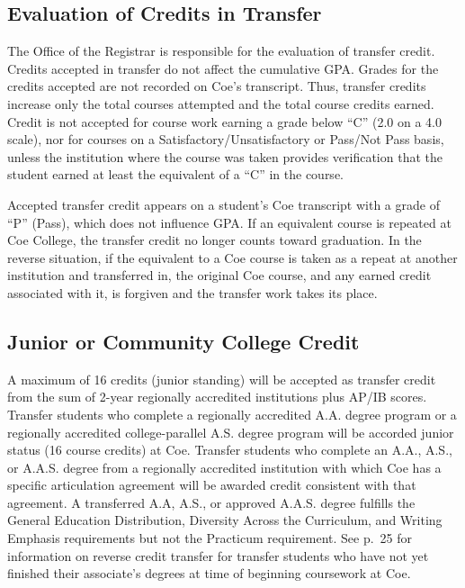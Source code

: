\documentclass[
  letterpaper,
]{scrbook}
\begin{document}
\subsection{Evaluation of Credits in
Transfer}\label{evaluation-of-credits-in-transfer}

The Office of the Registrar is responsible for the evaluation of
transfer credit. Credits accepted in transfer do not affect the
cumulative GPA. Grades for the credits accepted are not recorded on
Coe's transcript. Thus, transfer credits increase only the total courses
attempted and the total course credits earned. Credit is not accepted
for course work earning a grade below ``C'' (2.0 on a 4.0 scale), nor
for courses on a Satisfactory/Unsatisfactory or Pass/Not Pass basis,
unless the institution where the course was taken provides verification
that the student earned at least the equivalent of a ``C'' in the
course.

Accepted transfer credit appears on a student's Coe transcript with a
grade of ``P'' (Pass), which does not influence GPA. If an equivalent
course is repeated at Coe College, the transfer credit no longer counts
toward graduation. In the reverse situation, if the equivalent to a Coe
course is taken as a repeat at another institution and transferred in,
the original Coe course, and any earned credit associated with it, is
forgiven and the transfer work takes its place.

\subsection{Junior or Community College
Credit}\label{junior-or-community-college-credit}

A maximum of 16 credits (junior standing) will be accepted as transfer
credit from the sum of 2-year regionally accredited institutions plus
AP/IB scores. Transfer students who complete a regionally accredited
A.A. degree program or a regionally accredited college-parallel A.S.
degree program will be accorded junior status (16 course credits) at
Coe. Transfer students who complete an A.A., A.S., or A.A.S. degree from
a regionally accredited institution with which Coe has a specific
articulation agreement will be awarded credit consistent with that
agreement. A transferred A.A, A.S., or approved A.A.S. degree fulfills
the General Education Distribution, Diversity Across the Curriculum, and
Writing Emphasis requirements but not the Practicum requirement. See
p.~25 for information on reverse credit transfer for transfer students
who have not yet finished their associate's degrees at time of beginning
coursework at Coe.
\end{document}
